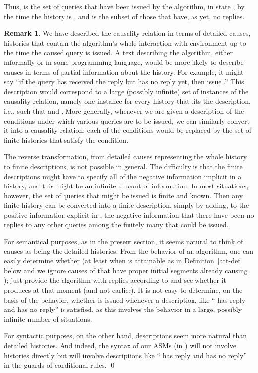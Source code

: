 \documentclass{LMCS}
\theoremstyle{definition}
\newtheorem{rmk}[thm]{Remark}
\begin{document}
Thus,  is the set of queries that have been
issued by the algorithm, in state , by the time the history is
, and  is the subset of those that have,
as yet, no replies.

\begin{rmk}   \label{descr-causes}
  We have described the causality relation in terms of detailed
  causes, histories  that contain the algorithm's whole
  interaction with environment up to the time the caused query is
  issued.  A text describing the algorithm, either informally or in
  some programming language, would be more likely to describe causes
  in terms of partial information about the history.  For example, it
  might say ``if the query  has received the reply  but  has
  no reply yet, then issue .''  This description would correspond
  to a large (possibly infinite) set of instances  of the
  causality relation, namely one instance for every history  that
  fits the description, i.e., such that  and
  .  More generally, whenever we are given a
  description of the conditions under which various queries are to be
  issued, we can similarly convert it into a causality relation; each
  of the conditions would be replaced by the set of finite histories
  that satisfy the condition.

The reverse transformation, from detailed causes representing the
whole history to finite descriptions, is not possible in general.  The
difficulty is that the finite descriptions might have to specify all
of the negative information implicit in a history, and this might be
an infinite amount of information.  In most situations, however, the
set of queries that might be issued is finite and known.  Then any
finite history  can be converted into a finite description,
simply by adding, to the positive information explicit in , the
negative information that there have been no replies to any other
queries among the finitely many that could be issued.

For semantical purposes, as in the present section, it seems natural
to think of causes as being the detailed histories.  From the behavior
of an algorithm, one can easily determine whether  (at
least when  is attainable as in Definition~\ref{att-def} below
and we ignore causes of  that have proper initial segments already
causing ); just provide the algorithm with replies according to
 and see whether it produces  at that moment (and not
earlier).  It is not easy to determine, on the basis of the behavior,
whether  is issued whenever a description, like `` has reply 
and  has no reply'' is satisfied, as this involves the behavior in
a large, possibly infinite number of situations.

For syntactic purposes, on the other hand, descriptions seem more
natural than detailed histories.  And indeed, the syntax of our ASMs
(in \cite{ga2}) will not involve histories directly but will involve
descriptions like `` has reply  and  has no reply'' in the
guards of conditional rules. \qed\end{rmk}
\end{document}
